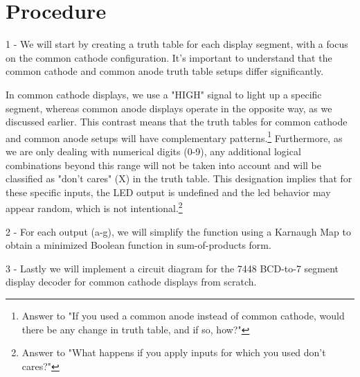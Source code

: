 \section{Procedure}

1 - We will start by creating a truth table for each display segment, with a focus on the common cathode configuration. It's important to understand that the common cathode and common anode truth table setups differ significantly.

In common cathode displays, we use a "HIGH" signal to light up a specific segment, whereas common anode displays operate in the opposite way, as we discussed earlier. This contrast means that the truth tables for common cathode and common anode setups will have complementary patterns.\footnote{Answer to "If you used a common anode instead of common cathode, would there be any change in truth table, and if so, how?"}
Furthermore, as we are only dealing with numerical digits (0-9),  any additional logical combinations beyond this range will not be taken into account and will be classified as "don't cares" (X) in the truth table. This designation implies that for these specific inputs, the LED output is undefined and the led behavior may appear random, which is not intentional.\footnote{Answer to "What happens if you apply inputs for which you used don’t cares?"}

2 - For each output (a-g), we will simplify the function using a Karnaugh Map to obtain a minimized Boolean function in sum-of-products form.

3 - Lastly we will implement a circuit diagram for the 7448 BCD-to-7 segment display decoder for common cathode displays from scratch.\cite{labmanual}

